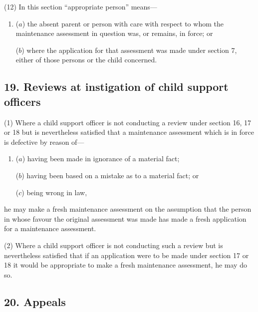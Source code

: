 \documentclass[12pt,a4paper]{article}
\begin{document}
(12) In this section “appropriate person” means—
\begin{enumerate}\item[]
($a$) the absent parent or person with care with respect to whom the maintenance assessment in question was, or remains, in force; or

($b$) where the application for that assessment was made under section 7, either of those persons or the child concerned.
\end{enumerate}


\subsection{19. Reviews at instigation of child support officers}

(1) Where a child support officer is not conducting a review under section 16, 17 or 18 but is nevertheless satisfied that a maintenance assessment which is in force is defective by reason of—
\begin{enumerate}\item[]
($a$) having been made in ignorance of a material fact;

($b$) having been based on a mistake as to a material fact; or

($c$) being wrong in law,
\end{enumerate}
he may make a fresh maintenance assessment on the assumption that the person in whose favour the original assessment was made has made a fresh application for a maintenance assessment.

(2) Where a child support officer is not conducting such a review but is nevertheless satisfied that if an application were to be made under section 17 or 18 it would be appropriate to make a fresh maintenance assessment, he may do so.



\subsection{20. Appeals}
\end{document}
